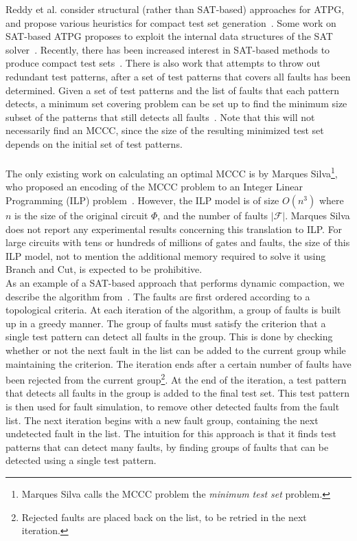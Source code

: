 \documentclass{article}
\newcommand{\MCCC}{\textsc{MCCC}\xspace}
\newcommand{\F}{\mathcal{F}}
\begin{document}
Reddy et al. consider structural (rather than SAT-based) approaches for ATPG, and propose various heuristics for compact test set generation~\cite{pomeranz93,10.1109/TEST.2013.6651914}. Some work on SAT-based ATPG proposes to exploit the internal data structures of the SAT solver~\cite{5359362}. Recently, there has been increased interest in SAT-based methods to produce compact test sets~\cite{6628311,DBLP:journals/it/EggersglussD14,6847807,10.1109/VLSID.2014.17}. There is also work that attempts to throw out redundant test patterns, after a set of test patterns that covers all faults has been determined. Given a set of test patterns and the list of faults that each pattern detects, a minimum set covering problem can be set up to find the minimum size subset of the patterns that still detects all faults~\cite{conf/glvlsi/FloresNS99}. Note that this will not necessarily find an \MCCC, since the size of the resulting minimized test set depends on the initial set of test patterns.\\ \\

The only existing work on calculating an optimal \MCCC is by Marques Silva\footnote{Marques Silva calls the \MCCC problem the \textit{minimum test set} problem.}, who proposed an encoding of the \MCCC problem to an Integer Linear Programming (ILP) problem~\cite{DBLP:conf/aspdac/Silva98}. However, the ILP model is of size $O(n^3)$ where $n$ is the size of the original circuit $\Phi$, and the number of faults $|\F|$. Marques Silva does not report any experimental results  concerning this translation to ILP. For large circuits with tens or hundreds of millions of gates and faults, the size of this ILP model, not to mention the additional memory required to solve it using Branch and Cut, is expected to be prohibitive. \\


As an example of a SAT-based approach that performs dynamic compaction, we describe the algorithm from~\cite{10.1109/VLSID.2014.17}. The faults are first ordered according to a topological criteria. At each iteration of the algorithm, a group of faults is built up in a greedy manner. The group of faults must satisfy the criterion that a single test pattern can detect all faults in the group. This is done by checking whether or not the next fault in the list can be added to the current group while maintaining the criterion. The iteration ends after a certain number of faults have been rejected from the current group\footnote{Rejected faults are placed back on the list, to be retried in the next iteration.}.  At the end of the iteration, a test pattern that detects all faults in the group is added to the final test set. This test pattern is then used for fault simulation, to remove other detected faults from the fault list. The next iteration begins with a new fault group, containing the next undetected fault in the list. The intuition for this approach is that it finds test patterns that can detect many faults, by finding groups of faults that can be detected using a single test pattern. \\
\end{document}
